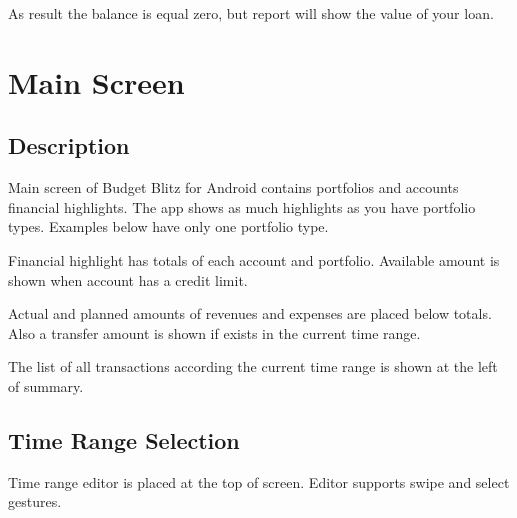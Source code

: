 \documentclass[a4paper,10pt,english]{sphinxmanual}
\begin{document}
\sphinxAtStartPar
As result the balance is equal zero, but  report will show the value of your loan.

\sphinxstepscope


\chapter{Main Screen}
\label{\detokenize{main-screen:main-screen}}\label{\detokenize{main-screen:chapter-main-screen}}\label{\detokenize{main-screen::doc}}

\section{Description}
\label{\detokenize{main-screen:description}}
\sphinxAtStartPar
Main screen of Budget Blitz for Android contains portfolios and accounts financial highlights. The app shows
as much highlights as you have portfolio types. Examples below have only one  portfolio type.

\sphinxAtStartPar
Financial highlight has totals of each account and portfolio. Available amount is shown when account
has a credit limit.

\sphinxAtStartPar
Actual and planned amounts of revenues and expenses are placed below totals. Also a transfer amount is shown
if exists in the current time range.

\noindent{}

\noindent{}

\noindent{}

\sphinxAtStartPar
The list of all transactions according the current time range is shown at the left of summary.


\section{Time Range Selection}
\label{\detokenize{main-screen:time-range-selection}}
\sphinxAtStartPar
Time range editor is placed at the top of screen. Editor supports swipe and select gestures.

\noindent{}
\end{document}
